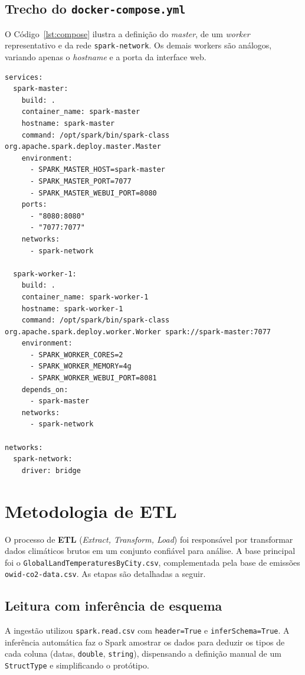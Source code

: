 \subsection{Trecho do \texttt{docker-compose.yml}}

O Código~\ref{lst:compose} ilustra a definição do \textit{master}, de um \textit{worker}
representativo e da rede \texttt{spark-network}. Os demais workers são análogos, variando
apenas o \textit{hostname} e a porta da interface web.

\begin{lstlisting}[language={},caption={Trecho do \texttt{docker-compose.yml}: master, worker e rede bridge.},label={lst:compose}]
services:
  spark-master:
    build: .
    container_name: spark-master
    hostname: spark-master
    command: /opt/spark/bin/spark-class org.apache.spark.deploy.master.Master
    environment:
      - SPARK_MASTER_HOST=spark-master
      - SPARK_MASTER_PORT=7077
      - SPARK_MASTER_WEBUI_PORT=8080
    ports:
      - "8080:8080"
      - "7077:7077"
    networks:
      - spark-network

  spark-worker-1:
    build: .
    container_name: spark-worker-1
    hostname: spark-worker-1
    command: /opt/spark/bin/spark-class org.apache.spark.deploy.worker.Worker spark://spark-master:7077
    environment:
      - SPARK_WORKER_CORES=2
      - SPARK_WORKER_MEMORY=4g
      - SPARK_WORKER_WEBUI_PORT=8081
    depends_on:
      - spark-master
    networks:
      - spark-network

networks:
  spark-network:
    driver: bridge
\end{lstlisting}

\section{Metodologia de ETL}
\label{sec:etl}

O processo de \textbf{ETL} (\textit{Extract, Transform, Load}) foi responsável por
transformar dados climáticos brutos em um conjunto confiável para análise. A base
principal foi o \texttt{GlobalLandTemperaturesByCity.csv}, complementada pela base de
emissões \texttt{owid-co2-data.csv}. As etapas são detalhadas a seguir.

\subsection{Leitura com inferência de esquema}

A ingestão utilizou \texttt{spark.read.csv} com \texttt{header=True} e
\texttt{inferSchema=True}. A inferência automática faz o Spark amostrar os dados para
deduzir os tipos de cada coluna (datas, \texttt{double}, \texttt{string}), dispensando a
definição manual de um \texttt{StructType} e simplificando o protótipo.

